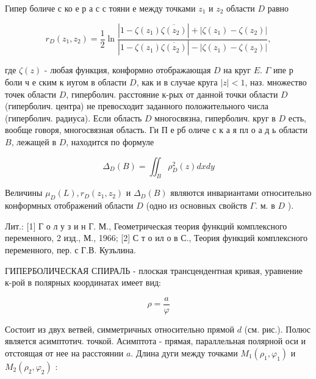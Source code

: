 \documentclass[10pt]{article}
\begin{document}
Гипер боличе с ко е р а с с тояни е между точками $z_{1}$ и $z_{2}$ области $D$ равно



\[

r_{D}\left(z_{1}, z_{2}\right)=\frac{1}{2} \ln \frac{\left|1-\zeta\left(z_{1}\right) \overline{\zeta\left(z_{2}\right)}\right|+\left|\zeta\left(z_{1}\right)-\zeta\left(z_{2}\right)\right|}{\left|1-\zeta\left(z_{1}\right) \overline{\zeta\left(z_{2}\right)}\right|-\left|\zeta\left(z_{1}\right)-\zeta\left(z_{2}\right)\right|},

\]



где $\zeta(z)$ - любая функция, конформно отображающая $D$ на круг $E$. $\Gamma$ ипе р боли ч е ским к иугом в области $D$, как и в случае круга $|z|<1$, наз. множество точек области $D$, гиперболич. расстояние к-рых от данной точки области $D$ (гиперболич. центра) не превосходит заданного положительного числа (гиперболич. радиуса). Если область $D$ многосвязна, гиперболич. круг в $D$ есть, вообще говоря, многосвязная область. Ги П е рб оличе с к а я пл о а д ь области $B$, лежащей в $D$, находится по формуле



\[

\Delta_{D}(B)=\iint_{B} \rho_{D}^{2}(z) d x d y

\]



Величины $\mu_{D}(L), r_{D}\left(z_{1}, z_{2}\right)$ и $\Delta_{D}(B)$ являются инвариантами относительно конформных отображений области $D$ (одно из основных свойств $\Gamma$. м. в $D$ ).



Лит.: [1] Г о л у з и н Г. М., Геометрическая теория функций комплексного переменного, 2 изд., М., 1966; [2] С т о ил о в С., Теория функций комплексного переменного, пер. с Г.В. Кузълина.



ГИПЕРБОЛИЧЕСКАЯ СПИРАЛЬ - плоская трансцендентная кривая, уравнение к-рой в полярных координатах имеет вид:



\[

\rho=\frac{a}{\varphi}

\]



Состоит из двух ветвей, симметричных относительно прямой $d$ (см. рис.). Полюс является асимптотич. точкой. Асимптота - прямая, параллельная полярной оси и отстоящая от нее на расстоянии $a$. Длина дуги между точками $M_{1}\left(\rho_{1}, \varphi_{1}\right)$ и $M_{2}\left(\rho_{2}, \varphi_{2}\right)$ :
\end{document}
